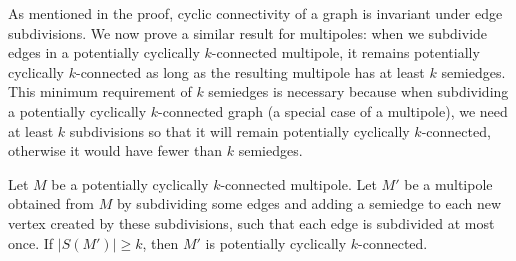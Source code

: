 \documentclass[12pt, twoside]{book}
\begin{document}
As mentioned in the proof, cyclic connectivity of a graph is invariant under edge subdivisions. We now prove a similar result for multipoles: when we subdivide edges in a potentially cyclically \mbox{$k$-connected} multipole, it remains potentially cyclically $k$-connected as long as the resulting multipole has at least $k$ semiedges. This minimum requirement of $k$ semiedges is necessary because when subdividing a potentially cyclically $k$-connected graph (a special case of a multipole), we need at least $k$ subdivisions so that it will remain potentially cyclically $k$-connected, otherwise it would have fewer than $k$ semiedges.


\begin{theorem}\label{th:subdivisions-potentially-cyclically-connected}
	Let $M$ be a potentially cyclically $k$-connected multipole. Let $M'$ be a multipole obtained from $M$ by subdividing some edges and adding a semiedge to each new vertex created by these subdivisions, such that each edge is subdivided at most once. If $|S(M')|\geq k$, then $M'$ is potentially cyclically $k$-connected.
\end{theorem}
\end{document}
